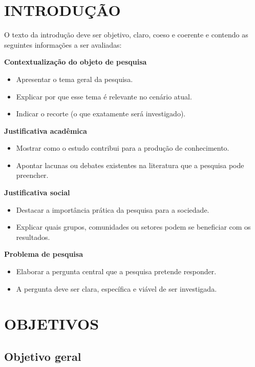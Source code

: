 \documentclass[
  brazilian,
  12pt,
  letterpaper,
  DIV=11,
  numbers=noendperiod]{scrartcl}
\begin{document}
\section{INTRODUÇÃO}\label{introduuxe7uxe3o}

O texto da introdução deve ser objetivo, claro, coeso e coerente e
contendo as seguintes informações a ser avaliadas:

\textbf{Contextualização do objeto de pesquisa}

\begin{itemize}
\item
  Apresentar o tema geral da pesquisa.
\item
  Explicar por que esse tema é relevante no cenário atual.
\item
  Indicar o recorte (o que exatamente será investigado).
\end{itemize}

\textbf{Justificativa acadêmica}

\begin{itemize}
\item
  Mostrar como o estudo contribui para a produção de conhecimento.
\item
  Apontar lacunas ou debates existentes na literatura que a pesquisa
  pode preencher.
\end{itemize}

\textbf{Justificativa social}

\begin{itemize}
\item
  Destacar a importância prática da pesquisa para a sociedade.
\item
  Explicar quais grupos, comunidades ou setores podem se beneficiar com
  os resultados.
\end{itemize}

\textbf{Problema de pesquisa}

\begin{itemize}
\item
  Elaborar a pergunta central que a pesquisa pretende responder.
\item
  A pergunta deve ser clara, específica e viável de ser investigada.
\end{itemize}

\section{OBJETIVOS}\label{objetivos}

\subsection{Objetivo geral}\label{objetivo-geral}
\end{document}
